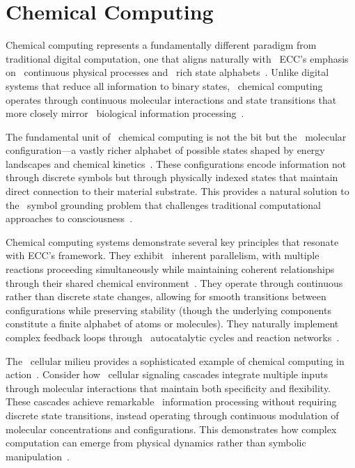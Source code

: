 \section{Chemical Computing}

 Chemical computing represents a fundamentally different paradigm from~ traditional digital computation, one that aligns naturally with~ ECC's emphasis on~ continuous physical processes and~ rich state alphabets~\cite{Adamatzky2021,Calude2018a,Toffoli2019}. Unlike digital systems that reduce all information to binary states,~ chemical computing operates through continuous molecular interactions and state transitions that more closely mirror~ biological information processing~\cite{Benenson2019,Gorecki2020}.

The fundamental unit of~ chemical computing is not the bit but the~ molecular configuration—a vastly richer alphabet of possible states shaped by energy landscapes and chemical kinetics~\cite{Dittrich2018,Deacon2019}. These configurations encode information not through discrete symbols but through physically indexed states that maintain direct connection to their material substrate. This provides a natural solution to the~ symbol grounding problem that challenges traditional computational approaches to consciousness~\cite{harnad1990symbol}.

 Chemical computing systems demonstrate several key principles that resonate with ECC's framework. They exhibit~ inherent parallelism, with multiple reactions proceeding simultaneously while maintaining coherent relationships through their shared chemical environment~\cite{Hjelmfelt1991,MacLennan2009}. They operate through continuous rather than discrete state changes, allowing for smooth transitions between configurations while preserving stability (though the underlying components constitute a finite alphabet of atoms or molecules). They naturally implement complex feedback loops through~ autocatalytic cycles and reaction networks~\cite{Katz2012,Adamatzky2016}.

The~ cellular milieu provides a sophisticated example of chemical computing in action~\cite{Lehn2013,lane2010life}. Consider how~ cellular signaling cascades integrate multiple inputs through molecular interactions that maintain both specificity and flexibility. These cascades achieve remarkable~ information processing without requiring discrete state transitions, instead operating through continuous modulation of molecular concentrations and configurations. This demonstrates how complex computation can emerge from physical dynamics rather than symbolic manipulation~\cite{pellerin2004neuroenergetics}.

